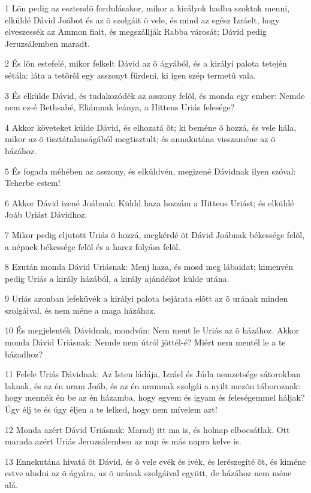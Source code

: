 \par 1 Lõn pedig az esztendõ fordulásakor, mikor a királyok hadba szoktak menni, elküldé Dávid Joábot és az õ szolgáit õ vele, és mind az egész Izráelt, hogy elveszessék az Ammon fiait, és megszállják Rabba városát; Dávid pedig Jeruzsálemben maradt.
\par 2 És lõn estefelé, mikor felkelt Dávid az õ ágyából, és a királyi palota tetején sétála: láta a tetõrõl egy asszonyt fürdeni, ki igen szép termetû vala.
\par 3 És elkülde Dávid, és tudakozódék az asszony felõl, és monda egy ember: Nemde nem ez-é Bethsabé, Eliámnak leánya, a Hitteus Uriás felesége?
\par 4 Akkor követeket külde Dávid, és elhozatá õt; ki beméne õ hozzá, és vele hála, mikor az õ tisztátalanságából megtisztult; és annakutána visszaméne az õ házához.
\par 5 És fogada méhében az asszony, és elküldvén, megizené Dávidnak ilyen szóval: Teherbe estem!
\par 6 Akkor Dávid izené Joábnak: Küldd haza hozzám a Hitteus Uriást; és elküldé Joáb Uriást Dávidhoz.
\par 7 Mikor pedig eljutott Uriás õ hozzá, megkérdé õt Dávid Joábnak békessége felõl, a népnek békessége felõl és a harcz folyása felõl.
\par 8 Ezután monda Dávid Uriásnak: Menj haza, és mosd meg lábaidat; kimenvén pedig Uriás a király házából, a király ajándékot külde utána.
\par 9 Uriás azonban lefeküvék a királyi palota bejárata elõtt az õ urának minden szolgáival, és nem méne a maga házához.
\par 10 És megjelenték Dávidnak, mondván: Nem ment le Uriás az õ házához. Akkor monda Dávid Uriásnak: Nemde nem útról jöttél-é? Miért nem mentél le a te házadhoz?
\par 11 Felele Uriás Dávidnak: Az Isten ládája, Izráel és Júda nemzetsége sátorokban laknak, és az én uram Joáb, és az én uramnak szolgái a nyilt mezõn táboroznak: hogy mennék én be az én házamba, hogy egyem és igyam és feleségemmel háljak? Úgy élj  te és úgy éljen a te lelked, hogy nem mívelem azt!
\par 12 Monda azért Dávid Uriásnak: Maradj itt ma is, és holnap elbocsátlak. Ott marada azért Uriás Jeruzsálemben az nap és más napra kelve is.
\par 13 Ennekutána hivatá õt Dávid, és õ vele evék és ivék, és lerészegíté õt, és kiméne estve aludni az õ ágyára, az õ urának szolgáival együtt, de házához nem méne alá.
